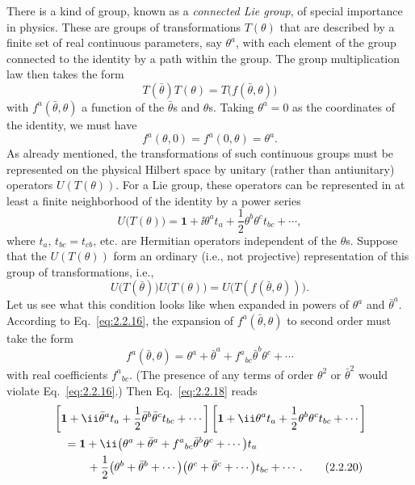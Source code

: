 There is a kind of group, known as a \emph{connected Lie group}, of
special importance in physics. These are groups of transformations
$T(\theta)$ that are described by a finite set of real continuous
parameters, say $\theta^a$, with each element of the group connected to
the identity by a path within the group. The group multiplication law then
takes the form
\begin{equation}
  T(\bar\theta)T(\theta)=T\bigl(f(\bar\theta,\theta)\bigr)
  \tag{2.2.15}\label{eq:2.2.15}
\end{equation}
with $f^a(\bar\theta,\theta)$ a function of the $\bar\theta$s and $\theta$s.
Taking $\theta^a=0$ as the coordinates of the identity, we must have
\begin{equation}
  f^a(\theta,0)=f^a(0,\theta)=\theta^a.
  \tag{2.2.16}\label{eq:2.2.16}
\end{equation}
As already mentioned, the transformations of such continuous groups must
be represented on the physical Hilbert space by unitary (rather than
antiunitary) operators $U(T(\theta))$. For a Lie group, these operators can
be represented in at least a finite neighborhood of the identity by a
power series
\begin{equation}
  U\bigl(T(\theta)\bigr)
    =\mathbf{1}+\ii\theta^a t_a+\frac{1}{2}\theta^b\theta^c t_{bc}+\cdots,
  \tag{2.2.17}\label{eq:2.2.17}
\end{equation}
where $t_a$, $t_{bc}=t_{cb}$, etc. are Hermitian operators independent of
the $\theta$s. Suppose that the $U(T(\theta))$ form an ordinary (i.e., not
projective) representation of this group of transformations, i.e.,
\begin{equation}
  U\bigl(T(\bar\theta)\bigr)U\bigl(T(\theta)\bigr)
    =U\bigl(T(f(\bar\theta,\theta))\bigr).
  \tag{2.2.18}\label{eq:2.2.18}
\end{equation}
Let us see what this condition looks like when expanded in powers of
$\theta^a$ and $\bar\theta^a$. According to Eq.~\eqref{eq:2.2.16}, the expansion of
$f^a(\bar\theta,\theta)$ to second order must take the form
\begin{equation}
  f^a(\bar\theta,\theta)
    =\theta^a+\bar\theta^a+f^a{}_{bc}\bar\theta^b\theta^c+\cdots
  \tag{2.2.19}\label{eq:2.2.19}
\end{equation}
with real coefficients $f^a{}_{bc}$. (The presence of any terms of order
$\theta^2$ or $\bar\theta^2$ would violate Eq.~\eqref{eq:2.2.16}.) Then
Eq.~\eqref{eq:2.2.18} reads
\begin{align}
  &\left[\mathbf{1}+\ii\bar\theta^a t_a
    +\frac{1}{2}\bar\theta^b\bar\theta^c t_{bc}+\cdots\right]
  \left[\mathbf{1}+\ii\theta^a t_a
    +\frac{1}{2}\theta^b\theta^c t_{bc}+\cdots\right]
  \notag\\
  &\quad=\mathbf{1}
    +\ii\bigl(\theta^a+\bar\theta^a
      +f^a{}_{bc}\bar\theta^b\theta^c+\cdots\bigr)t_a
  \notag\\
  &\qquad\quad
    +\frac{1}{2}\bigl(\theta^b+\bar\theta^b+\cdots\bigr)
      \bigl(\theta^c+\bar\theta^c+\cdots\bigr)t_{bc}+\cdots.
  \tag{2.2.20}\label{eq:2.2.20}
\end{align}
